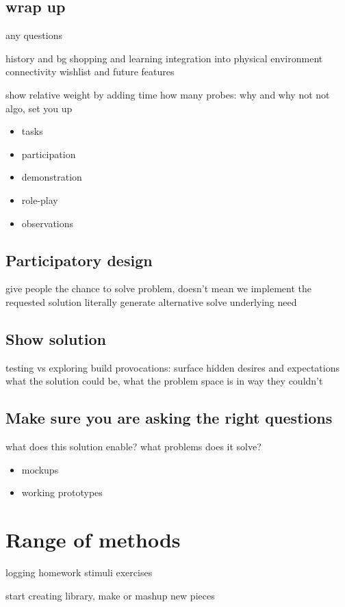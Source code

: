 \documentclass{article}
\begin{document}
\subsection{wrap up}
any questions

history and bg
shopping and learning
integration into physical environment
connectivity
wishlist and future features

show relative weight by adding time
how many probes: why and why not
not algo, set you up

\begin{itemize}
\item{tasks}
\item{participation}
\item{demonstration}
\item{role-play}
\item{observations}
\end{itemize}

\subsection{Participatory design}
give people the chance to solve problem, doesn't mean we implement the requested solution literally
generate alternative
solve underlying need

\subsection{Show solution}
testing vs exploring
build provocations: surface hidden desires and expectations
what the solution could be, what the problem space is in way they couldn't

\subsection{Make sure you are asking the right questions}
what does this solution enable? what problems does it solve?

\begin{itemize}
\item{mockups}
\item{working prototypes}
\end{itemize}

\section{Range of methods}
logging
homework
stimuli
exercises

start creating library, make or mashup new pieces
\end{document}
